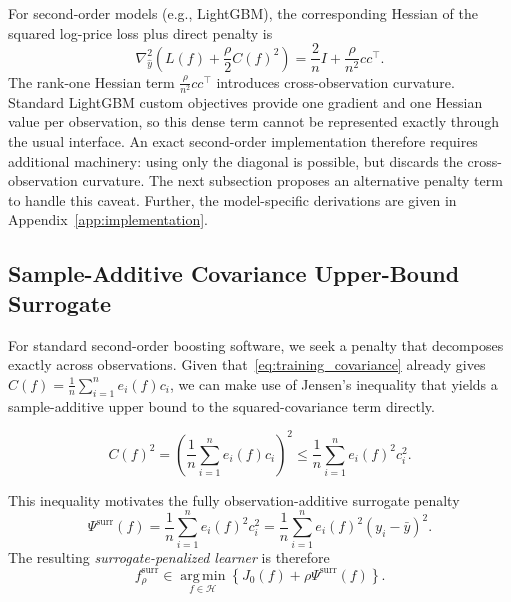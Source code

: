 \documentclass[10pt]{article}
\theoremstyle{definition}
\newcommand{\1}{\mathbf{1}}
\newcommand{\Hcal}{\mathcal{H}}
\newcommand{\argminop}{\operatorname*{arg\,min}}
\begin{document}
{For second-order models (e.g., LightGBM), the corresponding Hessian of the squared log-price loss plus direct penalty is}
{
\begin{equation}
\label{eq:direct_gradient_hessian}
\nabla_{\widehat y}^2
\left(
L(f)+\frac{\rho}{2}C(f)^2
\right)
=
\frac{2}{n}I+\frac{\rho}{n^2}cc^\top.
\end{equation}
}
The rank-one Hessian term $\frac{\rho}{n^{2}}cc^\top$ introduces cross-observation curvature. Standard LightGBM custom objectives provide one gradient and one Hessian value per observation, so this dense term cannot be represented exactly through the usual interface. An exact second-order implementation therefore requires additional machinery: using only the diagonal is possible, but discards the cross-observation curvature. The next subsection proposes an alternative penalty term to handle this caveat. Further, the model-specific derivations are given in Appendix~\ref{app:implementation}.


\subsection{Sample-Additive Covariance Upper-Bound Surrogate}
\label{subsec:surrogate}


{For standard second-order boosting software, we seek a penalty that decomposes exactly across observations. Given that~\eqref{eq:training_covariance} already gives $C(f)=\frac{1}{n}\sum_{i=1}^n e_i(f)c_i$, we can make use of Jensen's inequality that yields a sample-additive upper bound to the squared-covariance term directly.}


{
\begin{equation}
\label{eq:surrogate_upper_bound}
C(f)^2
=
\left(
\frac{1}{n}\sum_{i=1}^n e_i(f)c_i
\right)^2
\leq
\frac{1}{n}\sum_{i=1}^n e_i(f)^2c_i^2.
\end{equation}
}

{This inequality motivates the fully observation-additive surrogate penalty}
\begin{equation}
\label{eq:surrogate}
\Psi^{\mathrm{surr}}(f)
=
\frac{1}{n}\sum_{i=1}^n e_i(f)^2c_i^2
=
\frac{1}{n}\sum_{i=1}^n
e_i(f)^2(y_i-\bar y)^2.
\end{equation}
The resulting \emph{surrogate-penalized learner} is therefore
\begin{equation}
\label{eq:surrogate_learning}
f_\rho^{\mathrm{surr}}
\in
\argminop_{f\in\Hcal}
\left\{
{J_0(f)}
+
\rho\Psi^{\mathrm{surr}}(f)
\right\}.
\end{equation}
\end{document}
